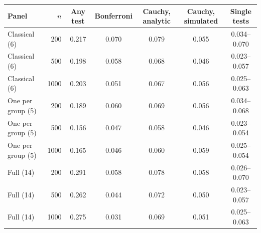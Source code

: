 \begin{tabular}{lrccccc}
\toprule
Panel & $n$ & Any test & Bonferroni & Cauchy, analytic & Cauchy, simulated & Single tests \\
\midrule
Classical (6) & 200 & 0.217 & 0.070 & 0.079 & 0.055 & 0.034--0.070 \\
Classical (6) & 500 & 0.198 & 0.058 & 0.068 & 0.046 & 0.023--0.057 \\
Classical (6) & 1000 & 0.203 & 0.051 & 0.067 & 0.056 & 0.025--0.063 \\
\addlinespace
One per group (5) & 200 & 0.189 & 0.060 & 0.069 & 0.056 & 0.034--0.068 \\
One per group (5) & 500 & 0.156 & 0.047 & 0.058 & 0.046 & 0.023--0.054 \\
One per group (5) & 1000 & 0.165 & 0.046 & 0.060 & 0.059 & 0.025--0.054 \\
\addlinespace
Full (14) & 200 & 0.291 & 0.058 & 0.078 & 0.058 & 0.026--0.070 \\
Full (14) & 500 & 0.262 & 0.044 & 0.072 & 0.050 & 0.023--0.057 \\
Full (14) & 1000 & 0.275 & 0.031 & 0.069 & 0.051 & 0.025--0.063 \\
\bottomrule
\end{tabular}